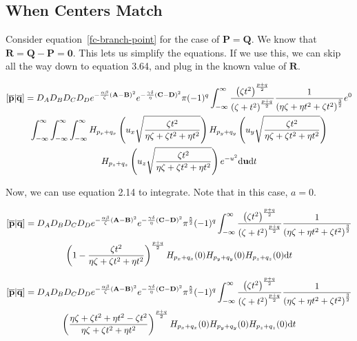 \subsection{When Centers Match}

Consider equation~\ref{fc-branch-point} for the case of $\mathbf{P} = \mathbf{Q}$. We know that $\mathbf{R} = \mathbf{Q} - \mathbf{P} = \mathbf{0}$. This lets us simplify the equations. If we use this, we can skip all the way down to equation 3.64, and plug in the known value of $\mathbf{R}$.

\begin{multline}
  \left[\overline{\mathbf{p}}\middle|\overline{\mathbf{q}}\right] = D_AD_BD_CD_D e^{-\frac{\alpha\beta}{\zeta}\left(\mathbf{A} - \mathbf{B}\right)^2}e^{-\frac{\gamma\delta}{\eta}\left(\mathbf{C} - \mathbf{D}\right)^2}\pi(-1)^q\int_{-\infty}^\infty \frac{\left(\zeta t^2\right)^{\frac{p + q}{2}}}{\left(\zeta + t^2\right)^{\frac{p + q}{2}}} \frac{1}{\left(\eta\zeta + \eta t^2 + \zeta t^2\right)^{\frac{3}{2}}} e^{0}\\
  \int_{-\infty}^\infty\int_{-\infty}^\infty\int_{-\infty}^\infty H_{p_x + q_x}\left(u_x\sqrt{\frac{\zeta t^2}{\eta\zeta + \zeta t^2 + \eta t^2}}\right)H_{p_y + q_y}\left(u_y\sqrt{\frac{\zeta t^2}{\eta\zeta + \zeta t^2 + \eta t^2}}\right)\\
  H_{p_z + q_z}\left(u_z\sqrt{\frac{\zeta t^2}{\eta\zeta + \zeta t^2 + \eta t^2}}\right)e^{-u^2}\mathrm{d} \mathbf{u}\mathrm{d} t
\end{multline}

Now, we can use equation 2.14 to integrate. Note that in this case, $a = 0$.

\begin{multline}
  \left[\overline{\mathbf{p}}\middle|\overline{\mathbf{q}}\right] = D_AD_BD_CD_D e^{-\frac{\alpha\beta}{\zeta}\left(\mathbf{A} - \mathbf{B}\right)^2}e^{-\frac{\gamma\delta}{\eta}\left(\mathbf{C} - \mathbf{D}\right)^2}\pi^{\frac{5}{2}}(-1)^q\int_{-\infty}^\infty \frac{\left(\zeta t^2\right)^{\frac{p + q}{2}}}{\left(\zeta + t^2\right)^{\frac{p + q}{2}}} \frac{1}{\left(\eta\zeta + \eta t^2 + \zeta t^2\right)^{\frac{3}{2}}}\\
  \left(1 - \frac{\zeta t^2}{\eta\zeta + \zeta t^2 + \eta t^2}\right)^{\frac{p + q}{2}}H_{p_x + q_x}(0)H_{p_y + q_y}(0)H_{p_z + q_z}(0)\mathrm{d} t
\end{multline}

\begin{multline}
  \left[\overline{\mathbf{p}}\middle|\overline{\mathbf{q}}\right] = D_AD_BD_CD_D e^{-\frac{\alpha\beta}{\zeta}\left(\mathbf{A} - \mathbf{B}\right)^2}e^{-\frac{\gamma\delta}{\eta}\left(\mathbf{C} - \mathbf{D}\right)^2}\pi^{\frac{5}{2}}(-1)^q\int_{-\infty}^\infty \frac{\left(\zeta t^2\right)^{\frac{p + q}{2}}}{\left(\zeta + t^2\right)^{\frac{p + q}{2}}} \frac{1}{\left(\eta\zeta + \eta t^2 + \zeta t^2\right)^{\frac{3}{2}}}\\
  \left(\frac{\eta\zeta + \zeta t^2 + \eta t^2 - \zeta t^2}{\eta\zeta + \zeta t^2 + \eta t^2}\right)^{\frac{p + q}{2}}H_{p_x + q_x}(0)H_{p_y + q_y}(0)H_{p_z + q_z}(0)\mathrm{d} t
\end{multline}

